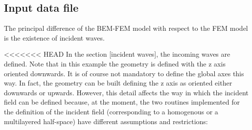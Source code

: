 \documentclass[a4]{article}
\begin{document}
\subsection{Input data file}

The principal difference of the BEM-FEM model with respect to the FEM model is the existence of incident waves.

<<<<<<< HEAD
In the section [incident waves], the incoming waves are defined. Note that in this example the geometry is defined with the z axis oriented downwards. It is of course not mandatory to define the global axes this way. In fact, the geometry can be built defining the z axis as oriented either downwards or upwards. However, this detail affects the way in which the incident field can be defined because, at the moment, the two routines implemented for the definition of the incident field (corresponding to a homogenous or a multilayered half-space) have different assumptions and restrictions:
\end{document}
